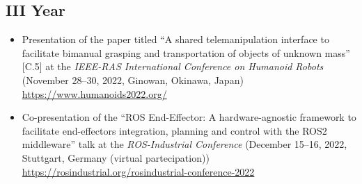\subsection{\textbf{III Year}}
\begin{itemize}
	\item Presentation of the paper titled \enquote{A shared telemanipulation interface to facilitate
	bimanual grasping and transportation of objects of unknown mass} [C.5] at the \textit{IEEE-RAS International Conference on Humanoid Robots} (November 28–30, 2022, Ginowan, Okinawa, Japan) \url{https://www.humanoids2022.org/}	
		
	\item Co-presentation of the \enquote{ROS End-Effector: A hardware-agnostic framework to facilitate end-effectors integration, planning and control with the ROS2 middleware} talk at the \textit{ROS-Industrial Conference} (December 15–16, 2022, Stuttgart, Germany (virtual partecipation)) \url{https://rosindustrial.org/rosindustrial-conference-2022}
	
\end{itemize}